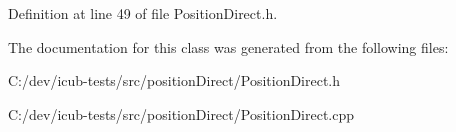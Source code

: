 Definition at line 49 of file Position\+Direct.\+h.



The documentation for this class was generated from the following files\+:\begin{DoxyCompactItemize}
\item 
C\+:/dev/icub-\/tests/src/position\+Direct/Position\+Direct.\+h\item 
C\+:/dev/icub-\/tests/src/position\+Direct/Position\+Direct.\+cpp\end{DoxyCompactItemize}
